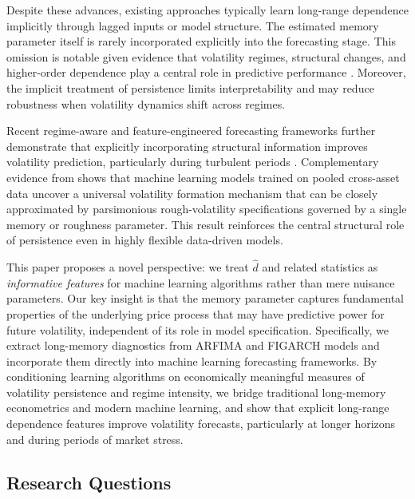 \documentclass[12pt,a4paper]{article}
\begin{document}
\vspace{0.3cm}
\noindent
Despite these advances, existing approaches typically learn long-range dependence implicitly through lagged inputs or model structure. The estimated memory parameter itself is rarely incorporated explicitly into the forecasting stage. This omission is notable given evidence that volatility regimes, structural changes, and higher-order dependence play a central role in predictive performance \citep{blake2025regime}. Moreover, the implicit treatment of persistence limits interpretability and may reduce robustness when volatility dynamics shift across regimes.

\vspace{0.3cm}
\noindent
Recent regime-aware and feature-engineered forecasting frameworks further demonstrate that explicitly incorporating structural information improves volatility prediction, particularly during turbulent periods \citep{blake2025regime}. Complementary evidence from \citet{rosenbaum2024universality} shows that machine learning models trained on pooled cross-asset data uncover a universal volatility formation mechanism that can be closely approximated by parsimonious rough-volatility specifications governed by a single memory or roughness parameter. This result reinforces the central structural role of persistence even in highly flexible data-driven models.

\vspace{0.3cm}
\noindent
This paper proposes a novel perspective: we treat $\hat{d}$ and related statistics as
\emph{informative features} for machine learning algorithms rather than mere nuisance
parameters. Our key insight is that the memory parameter captures fundamental properties of the underlying price process that may have predictive power for future volatility, independent of its role in model specification. Specifically, we extract long-memory diagnostics from ARFIMA and FIGARCH models and incorporate them directly into machine learning forecasting frameworks. By conditioning learning algorithms on economically meaningful measures of volatility persistence and regime intensity, we bridge traditional long-memory econometrics and modern machine learning, and show that explicit long-range dependence features improve volatility forecasts, particularly at longer horizons and during periods of market stress.

\subsection{Research Questions}
\end{document}
